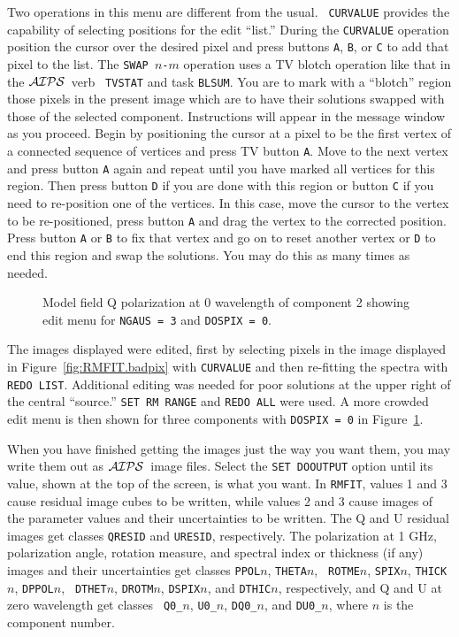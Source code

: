 \documentclass[twoside]{article}
\newcommand{\AIPS}{{$\cal AIPS\/$}}
\newcommand{\putfig}[1]{\texttt{[image: \#1.eps]}}
\begin{document}
Two operations in this menu are different from the usual.  {\tt
  CURVALUE} provides the capability of selecting positions for the
edit ``list.''  During the {\tt CURVALUE} operation position the
cursor over the desired pixel and press buttons {\tt A}, {\tt B}, or
{\tt C} to add that pixel to the list.  The {\tt SWAP $n$-$m$}
operation uses a TV blotch operation like that in the \AIPS\ verb {\tt
  TVSTAT} and task {\tt BLSUM}\@.  You are to mark with a ``blotch''
region those pixels in the present image which are to have their
solutions swapped with those of the selected component.  Instructions
will appear in the message window as you proceed.  Begin by
positioning the cursor at a pixel to be the first vertex of a
connected sequence of vertices and press TV button {\tt A}\@.  Move to
the next vertex and press button {\tt A} again and repeat until you
have marked all vertices for this region.  Then press button {\tt D}
if you are done with this region or button {\tt C} if you need to
re-position one of the vertices.  In this case, move the cursor to the
vertex to be re-positioned, press button {\tt A} and drag the vertex to
the corrected position.  Press button {\tt A} or {\tt B} to fix that
vertex and go on to reset another vertex or {\tt D} to end this region
and swap the solutions.  You may do this as many times as needed.

\begin{figure}
\begin{center}
\resizebox{6.0in}{!}{\putfig{RMFIT.3cedit}}
\caption{Model field Q polarization at 0 wavelength of component 2
  showing edit menu for {\tt NGAUS = 3} and {\tt DOSPIX = 0}.}
\label{fig:RMFIT.3cedit}
\end{center}
\end{figure}

The images displayed were edited, first by selecting pixels in the
image displayed in Figure~\ref{fig:RMFIT.badpix} with {\tt CURVALUE}
and then re-fitting the spectra with {\tt REDO LIST}\@.  Additional
editing was needed for poor solutions at the upper right of the
central ``source.''  {\tt SET RM RANGE} and {\tt REDO ALL} were used.
A more crowded edit menu is then shown for three components with
{\tt DOSPIX = 0} in Figure~\ref{fig:RMFIT.3cedit}.

When you have finished getting the images just the way you want them,
you may write them out as \AIPS\ image files.  Select the {\tt SET
  DOOUTPUT} option until its value, shown at the top of the screen, is
what you want.  In {\tt RMFIT}, values 1 and 3 cause residual image
cubes to be written, while values 2 and 3 cause images of the
parameter values and their uncertainties to be written.  The Q and U
residual images get classes {\tt QRESID} and {\tt URESID},
respectively.  The polarization at 1 GHz, polarization angle, rotation
measure, and spectral index or thickness (if any) images and their
uncertainties get classes {\tt PPOL$n$}, {\tt THETA$n$}, {\tt
  ROTME$n$}, {\tt SPIX$n$}, {\tt THICK$n$}, {\tt DPPOL$n$}, {\tt
  DTHET$n$}, {\tt DROTM$n$}, {\tt DSPIX$n$}, and {\tt DTHIC$n$},
respectively, and Q and U at zero wavelength get classes {\tt
  Q0\_$n$}, {\tt U0\_$n$}, {\tt DQ0\_$n$}, and  {\tt DU0\_$n$}, where
$n$ is the component number.
\vfill\eject
\end{document}

